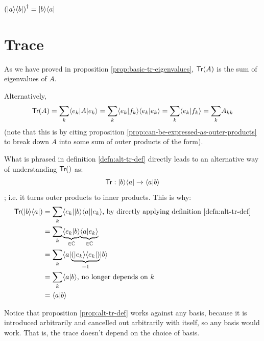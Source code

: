 \documentclass[12pt]{article}
\begin{document}
\begin{proposition}
$\left(|a\rangle\langle b|\right)^\dag = |b\rangle\langle a|$
\end{proposition}

\section{Trace}
\begin{definition}
As we have proved in proposition \ref{prop:basic-tr-eigenvalues}, $\textsf{Tr}(A)$ is the sum of eigenvalues of $A$.
\end{definition}

\begin{definition}\label{defn:alt-tr-def}
Alternatively, $$
\textsf{Tr}(A) = \underset{k}{\sum}\langle e_k|A |e_k\rangle = \underset{k}{\sum}\langle e_k|f_k\rangle \langle e_k|e_k\rangle = \underset{k}{\sum}\langle e_k|f_k\rangle = \underset{k}{\sum}A_{kk}
$$ (note that this is by citing proposition \ref{prop:can-be-expressed-as-outer-products} to break down $A$ into some sum of outer products of the form).
\end{definition}

\begin{proposition}\label{prop:alt-tr-def}
What is phrased in definition \ref{defn:alt-tr-def} directly leads to an alternative way of understanding $\Trace$ as: $$
\mathsf{Tr}: |b\rangle\langle a| \rightarrow \langle a|b\rangle
$$; i.e. it turns outer products to inner products. This is why:$$
\begin{aligned}
\textsf{Tr}(|b\rangle\langle a|)
    &= \underset{k}{\sum}\langle e_k||b\rangle\langle a||e_k\rangle\text{, by directly applying definition \ref{defn:alt-tr-def}}\\
    &= \underset{k}{\sum}\underset{\in {\mathbb C}}{\underbrace{\langle e_k|b\rangle}}\underset{\in {\mathbb C}}{\underbrace{\langle a|e_k\rangle}}\\
    &= \underset{k}{\sum}\langle a|\underset{=1}{\underbrace{\left(|e_k\rangle\langle e_k|\right)}}|b\rangle\\
    &= \underset{k}{\sum}\langle a|b\rangle\text{, no longer depends on $k$}\\
    &= \langle a|b\rangle
\end{aligned}
$$
\end{proposition}

\begin{remark}
Notice that proposition \ref{prop:alt-tr-def} works against any basis, because it is introduced arbitrarily and cancelled out arbitrarily with itself, so any basis would work. That is, the trace doesn't depend on the choice of basis.
\end{remark}
\end{document}
